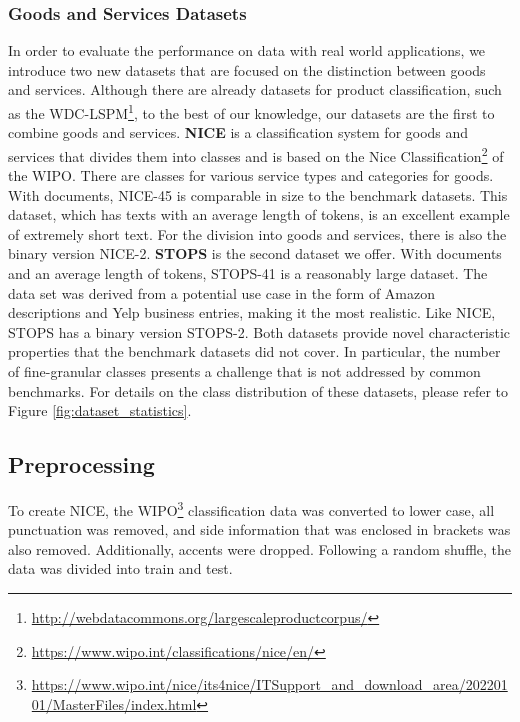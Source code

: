 \documentclass[runningheads]{llncs}
\begin{document}
\subsubsection{Goods and Services Datasets}
\label{ŝec:new-datasets}
In order to evaluate the performance on data with real world applications, we introduce two new datasets that are focused on the distinction between goods and services.
Although there are already datasets for product classification, such as the WDC-LSPM\footnote{\url{http://webdatacommons.org/largescaleproductcorpus/}}, to the best of our knowledge, our datasets are the first to combine goods and services.
\textbf{NICE} is a classification system for goods and services that divides them into  classes and is based on the Nice Classification\footnote{\url{https://www.wipo.int/classifications/nice/en/}} of the \ac{WIPO}. There are  classes for various service types and  categories for goods.
With  documents, NICE-45 is comparable in size to the benchmark datasets.
This dataset, which has texts with an average length of  tokens, is an excellent example of extremely short text. 
For the division into goods and services, there is also the binary version NICE-2.
\textbf{\ac{STOPS}} is the second dataset we offer. With  documents and an average length of  tokens, STOPS-41 is a reasonably large dataset. The data set was derived from a potential use case in the form of Amazon descriptions and Yelp business entries, making it the most realistic. Like NICE, STOPS has a binary version STOPS-2.
Both datasets provide novel characteristic properties that the benchmark datasets did not cover. In particular, the number of fine-granular classes presents a challenge that is not addressed by common benchmarks. For details on the class distribution of these datasets, please refer to Figure \ref{fig:dataset_statistics}.


\subsection{Preprocessing}
\label{sec:preprocessing}
To create NICE, the \ac{WIPO}\footnote{\url{https://www.wipo.int/nice/its4nice/ITSupport\_and\_download\_area/20220101/MasterFiles/index.html}} classification data was converted to lower case, all punctuation was removed, and side information that was enclosed in brackets was also removed. Additionally, accents were dropped.
Following a random shuffle, the data was divided into  train and  test.
\end{document}
